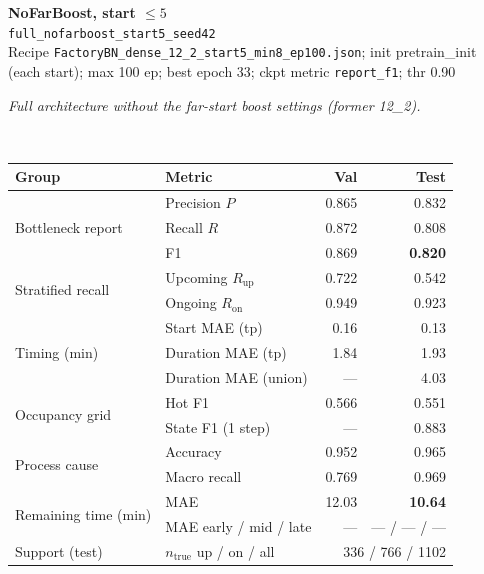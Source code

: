 \documentclass[9pt,a4paper,twocolumn]{extarticle}
\begin{document}
\noindent\begin{minipage}{\columnwidth}
\begin{center}
{\small\bfseries NoFarBoost, start $\le 5$}\\
{\scriptsize\texttt{full\_nofarboost\_start5\_seed42}}\\
{\scriptsize Recipe \texttt{FactoryBN\_dense\_12\_2\_start5\_min8\_ep100.json}; init pretrain\_init (each start); max 100 ep; best epoch 33; ckpt metric \texttt{report\_f1}; thr 0.90}\\[1pt]
\parbox{0.96\columnwidth}{\scriptsize\itshape Full architecture without the far-start boost settings (former 12\_2).}\\[2pt]
\scriptsize\setlength{\tabcolsep}{3pt}
\begin{tabular}{llrr}
\toprule
Group & Metric & Val & Test \\
\midrule
\multirow{3}{*}{Bottleneck report}
  & Precision $P$ & 0.865 & 0.832 \\
  & Recall $R$ & 0.872 & 0.808 \\
  & F1 & 0.869 & \textbf{0.820} \\
\midrule
\multirow{2}{*}{Stratified recall}
  & Upcoming $R_{\mathrm{up}}$ & 0.722 & 0.542 \\
  & Ongoing $R_{\mathrm{on}}$ & 0.949 & 0.923 \\
\midrule
\multirow{3}{*}{Timing (min)}
  & Start MAE (tp) & 0.16 & 0.13 \\
  & Duration MAE (tp) & 1.84 & 1.93 \\
  & Duration MAE (union) & --- & 4.03 \\
\midrule
\multirow{2}{*}{Occupancy grid}
  & Hot F1 & 0.566 & 0.551 \\
  & State F1 (1 step) & --- & 0.883 \\
\midrule
\multirow{2}{*}{Process cause}
  & Accuracy & 0.952 & 0.965 \\
  & Macro recall & 0.769 & 0.969 \\
\midrule
\multirow{2}{*}{Remaining time (min)}
  & MAE & 12.03 & \textbf{10.64} \\
  & MAE early / mid / late & --- & --- / --- / --- \\
\midrule
Support (test)
  & $n_{\mathrm{true}}$ up / on / all & \multicolumn{2}{r}{336 / 766 / 1102} \\
\bottomrule
\end{tabular}
\end{center}
\end{minipage}\par\vspace{6pt}
\end{document}
